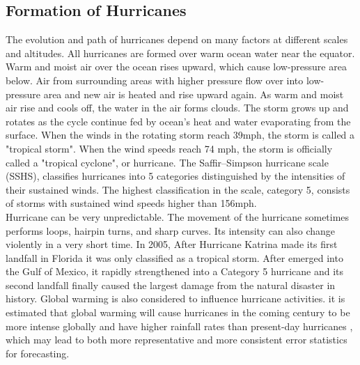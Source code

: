 \subsection{Formation of Hurricanes}
The evolution and path of hurricanes depend on many factors at different scales and altitudes. All hurricanes are formed over warm ocean water near the equator. Warm and moist air over the ocean rises upward, which cause low-pressure area below. Air from surrounding areas with higher pressure flow over into low-pressure area and new air is heated and rise upward again. As warm and moist air rise and cools off, the water in the air forms clouds. The storm grows up and rotates as the cycle continue fed by ocean's heat and water evaporating from the surface. When the winds in the rotating storm reach 39mph, the storm is called a "tropical storm". When the wind speeds reach 74 mph, the storm is officially called a "tropical cyclone", or hurricane. The Saffir–Simpson hurricane scale (SSHS), classifies hurricanes into 5 categories distinguished by the intensities of their sustained winds. The highest classification in the scale, category 5, consists of storms with sustained wind speeds higher than 156mph.\\
Hurricane can be very unpredictable. The movement of the hurricane sometimes performs loops, hairpin turns, and sharp curves. Its intensity can also change violently in a very short time. In 2005, After Hurricane Katrina made its first landfall in Florida it was only classified as a tropical storm. After emerged into the Gulf of Mexico, it rapidly strengthened into a Category 5 hurricane and its second landfall finally caused the largest damage from the natural disaster in history. Global warming is also considered to influence hurricane activities. it is estimated that global warming will cause hurricanes in the coming century to be more intense globally and have higher rainfall rates than present-day hurricanes \cite{knutson2013dynamical}, which may lead to both more representative and more consistent error statistics for forecasting.


